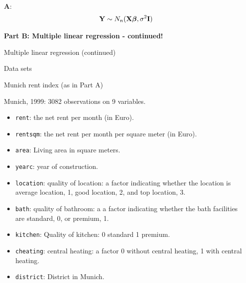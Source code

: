 \documentclass[10pt,ignorenonframetext,]{beamer}
\providecommand{\tightlist}{%
  \setlength{\itemsep}{0pt}\setlength{\parskip}{0pt}}
\begin{document}
\begin{frame}

\textbf{A}:
\[ {\bf Y} \sim N_{n}({\bf X} {\boldsymbol\beta},\sigma^2 {\bf I})\]

\end{frame}

\begin{frame}

\large

\textbf{Part B: Multiple linear regression - continued!}

\normalsize

\end{frame}

\begin{frame}[fragile]{Multiple linear regression (continued)}

\begin{block}{Data sets}

\begin{block}{Munich rent index (as in Part A)}

Munich, 1999: 3082 observations on 9 variables.

\begin{itemize}
\tightlist
\item
  \texttt{rent}: the net rent per month (in Euro).
\item
  \texttt{rentsqm}: the net rent per month per square meter (in Euro).
\item
  \texttt{area}: Living area in square meters.
\item
  \texttt{yearc}: year of construction.
\item
  \texttt{location}: quality of location: a factor indicating whether
  the location is average location, 1, good location, 2, and top
  location, 3.
\item
  \texttt{bath}: quality of bathroom: a a factor indicating whether the
  bath facilities are standard, 0, or premium, 1.
\item
  \texttt{kitchen}: Quality of kitchen: 0 standard 1 premium.
\item
  \texttt{cheating}: central heating: a factor 0 without central
  heating, 1 with central heating.
\item
  \texttt{district}: District in Munich.
\end{itemize}

\end{block}

\end{block}

\end{frame}
\end{document}
